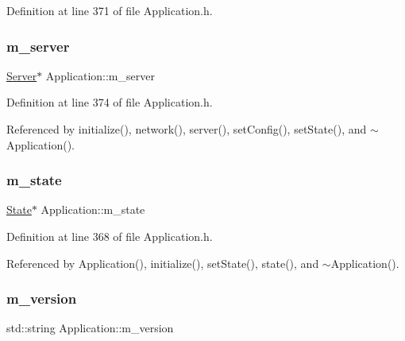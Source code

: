Definition at line 371 of file Application.\+h.

\mbox{\label{classApplication_a5e6085b0f322d5036177b16113a75b56}} 
\subsubsection{\texorpdfstring{m\+\_\+server}{m\_server}}
{\footnotesize\ttfamily \hyperlink{classServer}{Server}$\ast$ Application\+::m\+\_\+server\hspace{0.3cm}{\ttfamily [private]}}



Definition at line 374 of file Application.\+h.



Referenced by initialize(), network(), server(), set\+Config(), set\+State(), and $\sim$\+Application().

\mbox{\label{classApplication_a0ef9832e2d286716e597a1ff21ffcab4}} 
\subsubsection{\texorpdfstring{m\+\_\+state}{m\_state}}
{\footnotesize\ttfamily \hyperlink{classState}{State}$\ast$ Application\+::m\+\_\+state\hspace{0.3cm}{\ttfamily [private]}}



Definition at line 368 of file Application.\+h.



Referenced by Application(), initialize(), set\+State(), state(), and $\sim$\+Application().

\mbox{\label{classApplication_acbbdbd17a3a66782c54dbbe58a9ca8d8}} 
\subsubsection{\texorpdfstring{m\+\_\+version}{m\_version}}
{\footnotesize\ttfamily std\+::string Application\+::m\+\_\+version\hspace{0.3cm}{\ttfamily [protected]}}



